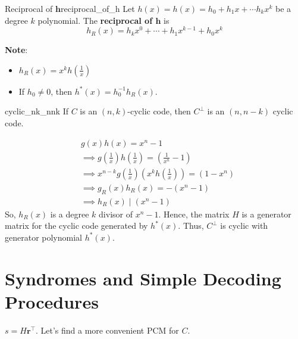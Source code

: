 \begin{Definition}{Reciprocal of $\symbf{h}$}{reciprocal_of_h}
    Let $ h(x)=h(x)=h_{0}+h_{1} x+\cdots h_k x^{k} $ be a degree $ k $
    polynomial. The \textbf{reciprocal of $\symbf{h}$} is
    \[ h_{R}(x)=h_k x^{0}+\cdots+h_{1}x^{k-1}+h_{0}x^{k} \]
\end{Definition}

\textbf{Note}:
\begin{itemize}
    \item $ h_R(x)=x^k h\left( \frac{1}{x} \right) $
    \item If $ h_0\neq 0 $, then $ h^*(x)=h_{0}^{-1}h_R(x) $.
\end{itemize}

\begin{Theorem}{}{cyclic_nk_nnk}
    If $ C $ is an $ (n,k) $-cyclic code, then $ C^{\perp} $ is an
    $ (n,n-k) $ cyclic code.
\end{Theorem}

\begin{Proof}{}{}
    \begin{align*}
         & g(x)h(x)=x^n-1                                                                                   \\
         & \implies g\left( \frac{1}{x} \right)h\left( \frac{1}{x}  \right)= \left( \frac{1}{x^n}-1 \right) \\
         & \implies x^{n-k}g\left( \frac{1}{x}  \right)\left( x^k h\left( \frac{1}{x} \right) \right)=
        (1-x^n)                                                                                             \\
         & \implies g_R(x)h_R(x)=-(x^n-1)                                                                   \\
         & \implies h_R(x)\mid (x^n-1)
    \end{align*}
    So, $ h_R(x) $ is a degree $ k $ divisor of $ x^n-1 $. Hence, the matrix
    $ H $ is a generator matrix for the cyclic code generated by $ h^*(x) $.
    Thus, $ C^{\perp} $ is cyclic with generator polynomial $ h^*(x) $.
\end{Proof}

\section{Syndromes and Simple Decoding Procedures}
$ s=H\symbf{r}^\top $. Let's find a more convenient PCM for $ C $.

